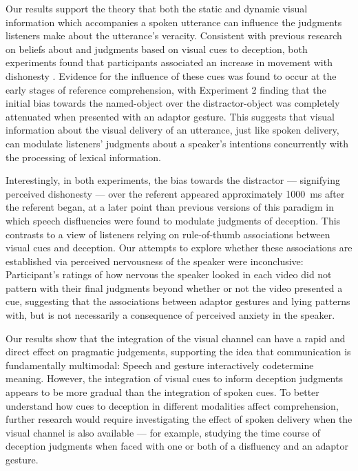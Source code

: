 \documentclass[a4paper,man,natbib]{apa6}
\begin{document}
Our results support the theory that both the static and dynamic visual information which accompanies a spoken utterance can influence the judgments listeners make about the utterance's veracity.
Consistent with previous research on beliefs about and judgments based on visual cues to deception, both experiments found that participants associated an increase in movement with dishonesty \citep{Zuckerman1981}. 
Evidence for the influence of these cues was found to occur at the early stages of reference comprehension, with Experiment 2 finding that the initial bias towards the named-object over the distractor-object was completely attenuated when presented with an adaptor gesture. 
This suggests that visual information about the visual delivery of an utterance, just like spoken delivery, can modulate listeners' judgments about a speaker's intentions concurrently with the processing of lexical information.

Interestingly, in both experiments, the bias towards the distractor --- signifying perceived dishonesty --- over the referent appeared approximately 1000~ms after the referent began, at a later point than previous versions of this paradigm in which speech disfluencies were found to modulate judgments of deception. 
This contrasts to a view of listeners relying on rule-of-thumb associations between visual cues and deception.
Our attempts to explore whether these associations are established via perceived nervousness of the speaker were inconclusive: Participant's ratings of how nervous the speaker looked in each video did not pattern with their final judgments beyond whether or not the video presented a cue, suggesting that the associations between adaptor gestures and lying patterns with, but is not necessarily a consequence of perceived anxiety in the speaker.

Our results show that the integration of the visual channel can have a rapid and direct effect on pragmatic judgements, supporting the idea that communication is fundamentally multimodal: 
Speech and gesture interactively codetermine meaning.
However, the integration of visual cues to inform deception judgments appears to be more gradual than the integration of spoken cues.
To better understand how cues to deception in different modalities affect comprehension, further research would require investigating the effect of spoken delivery when the visual channel is also available --- for example, studying the time course of deception judgments when faced with one or both of a disfluency and an adaptor gesture. %


\end{document}
